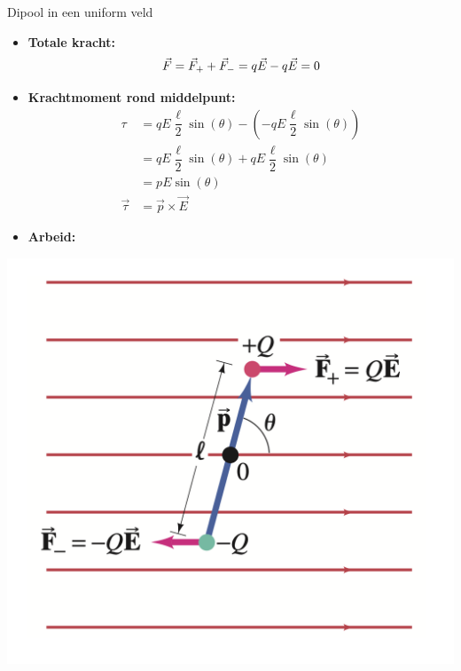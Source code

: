 \begin{app}{Dipool in een uniform veld}
    
    \begin{minipage}{.48\textwidth}
        \begin{itemize}
            \item \textbf{Totale kracht:}
                \begin{equation*}
                    \vspace{0.25cm}
                    \Vec{F} = \Vec{F}_++\Vec{F}_- = q\Vec{E} - q\Vec{E} = 0
                \end{equation*}
            \item \textbf{Krachtmoment rond middelpunt:}
                \begin{align*}
                     \tau &= qE\dfrac{\ell}{2}\sin(\theta) - (-qE\dfrac{\ell}{2}\sin(\theta)) \\
                     &= qE\dfrac{\ell}{2}\sin(\theta) + qE\dfrac{\ell}{2}\sin(\theta)  \\
                     &= pE\sin(\theta)  \\
                     \Vec{\tau} &= \Vec{p} \times \Vec{E}
                \end{align*}
            \item \textbf{Arbeid:}
        \end{itemize}
    \end{minipage} 
    \begin{minipage}{.48\textwidth}
        \centering
        \includegraphics[scale = 0.35]{Images/Elektriciteit/UniformDipool.png}
    \end{minipage}
    

\end{app}
